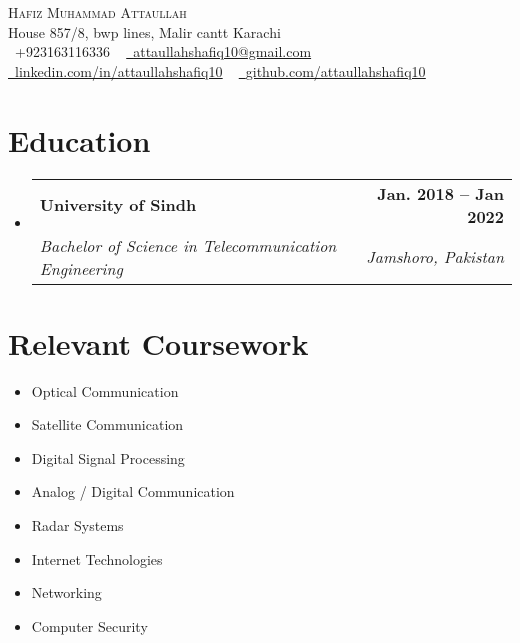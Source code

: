 \documentclass[letterpaper,11pt]{article}
\makeatletter
\newcommand{\resumeSubheading}[4]{
  \vspace{-2pt}\item
    \begin{tabular*}{1.0\textwidth}[t]{l@{\extracolsep{\fill}}r}
      \textbf{#1} & \textbf{\small #2} \\
      \textit{\small#3} & \textit{\small #4} \\
    \end{tabular*}\vspace{-7pt}
}
\newcommand{\resumeSubHeadingListStart}{\begin{itemize}[leftmargin=0.0in, label={}]}
\newcommand{\resumeSubHeadingListEnd}{\end{itemize}}
\makeatother
\begin{document}

\begin{center}
    {\Huge \scshape Hafiz Muhammad Attaullah} \\ \vspace{1pt}
    House 857/8, bwp lines, Malir cantt Karachi \\ \vspace{1pt}
    \small \raisebox{-0.1\height}\faPhone\ +923163116336 ~ \href{mailto:x@gmail.com}{\raisebox{-0.2\height}\faEnvelope\  \underline{attaullahshafiq10@gmail.com}} ~ 
    \href{https://linkedin.com/in//}{\raisebox{-0.2\height}\faLinkedin\ \underline{linkedin.com/in/attaullahshafiq10}}  ~
    \href{https://github.com/}{\raisebox{-0.2\height}\faGithub\ \underline{github.com/attaullahshafiq10}}
    \vspace{-8pt}
\end{center}


\section{Education}
  \resumeSubHeadingListStart
    \resumeSubheading
      {University of Sindh}{Jan. 2018 -- Jan 2022}
      {Bachelor of Science in Telecommunication Engineering}{Jamshoro, Pakistan}
  \resumeSubHeadingListEnd

\section{Relevant Coursework}
        \begin{multicols}{4}
            \begin{itemize}[itemsep=-5pt, parsep=3pt]
                \item\small Optical Communication
                \item Satellite Communication
                \item Digital Signal Processing
                \item Analog / Digital Communication
                \item Radar Systems 
                \item Internet Technologies
                \item Networking
                \item Computer Security
            \end{itemize}
        \end{multicols}
        \vspace*{2.0\multicolsep}
\end{document}

